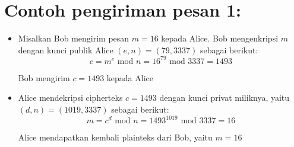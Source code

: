 \documentclass{article}
\begin{document}

\section*{Contoh pengiriman pesan 1:}

\begin{itemize}
    \item Misalkan Bob mengirim pesan $m = 16$ kepada Alice. Bob mengenkripsi $m$ dengan kunci publik Alice $(e, n) = (79, 3337)$ sebagai berikut:
    \[ c = m^e \text{ mod } n = 16^{79} \text{ mod } 3337 = 1493 \]
    
    Bob mengirim $c = 1493$ kepada Alice
    
    \item Alice mendekripsi cipherteks $c = 1493$ dengan kunci privat miliknya, yaitu $(d, n) = (1019, 3337)$ sebagai berikut:
    \[ m = c^d \text{ mod } n = 1493^{1019} \text{ mod } 3337 = 16 \]
    
    Alice mendapatkan kembali plainteks dari Bob, yaitu $m = 16$
\end{itemize}
\end{document}
